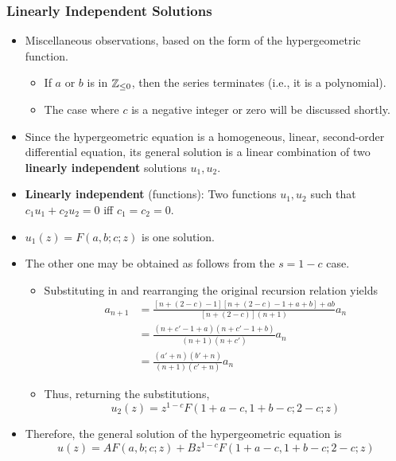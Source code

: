 \documentclass[../finalProject.tex]{subfiles}
\begin{document}
\subsubsection{Linearly Independent Solutions}\label{ss2:2.4.2}
\begin{itemize}
    \item Miscellaneous observations, based on the form of the hypergeometric function.
    \begin{itemize}
        \item If $a$ or $b$ is in $\mathbb{Z}_{\leq 0}$, then the series terminates (i.e., it is a polynomial).
        \item The case where $c$ is a negative integer or zero will be discussed shortly.
    \end{itemize}
    \item Since the hypergeometric equation is a homogeneous, linear, second-order differential equation, its general solution is a linear combination of two \textbf{linearly independent} solutions $u_1,u_2$.
    \item \textbf{Linearly independent} (functions): Two functions $u_1,u_2$ such that $c_1u_1+c_2u_2=0$ iff $c_1=c_2=0$.
    \item $u_1(z)=F(a,b;c;z)$ is one solution.
    \item The other one may be obtained as follows from the $s=1-c$ case.
    \begin{itemize}
        \item Substituting in and rearranging the original recursion relation yields
        \begin{align*}
            a_{n+1} &= \frac{[n+(2-c)-1][n+(2-c)-1+a+b]+ab}{[n+(2-c)](n+1)}a_n\\
            &= \frac{(n+c'-1+a)(n+c'-1+b)}{(n+1)(n+c')}a_n\\
            &= \frac{(a'+n)(b'+n)}{(n+1)(c'+n)}a_n
        \end{align*}
        \item Thus, returning the substitutions,
        \begin{equation*}
            u_2(z) = z^{1-c}F(1+a-c,1+b-c;2-c;z)
        \end{equation*}
    \end{itemize}
    \item Therefore, the general solution of the hypergeometric equation is
    \begin{equation*}
        u(z) = AF(a,b;c;z)+Bz^{1-c}F(1+a-c,1+b-c;2-c;z)
    \end{equation*}
\end{itemize}
\end{document}
